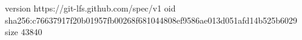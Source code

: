 version https://git-lfs.github.com/spec/v1
oid sha256:c76637917f20b01957fb00268f681044808ef9586ae013d051afd14b525b6029
size 43840

